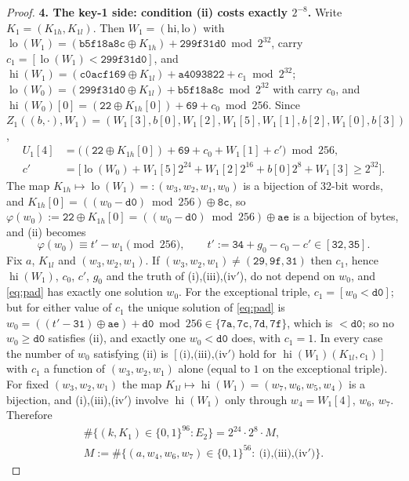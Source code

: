 \begin{proof}
\textbf{4. The key-1 side: condition (ii) costs exactly $2^{-8}$.}
Write $K_1=(K_{1h},K_{1l})$. Then $W_1=(\mathrm{hi},\mathrm{lo})$ with
$\operatorname{lo}(W_1)=(\mathtt{b5f18a8c}\oplus K_{1h})+\mathtt{299f31d0}\bmod2^{32}$, carry
$c_1=[\operatorname{lo}(W_1)<\mathtt{299f31d0}]$, and
$\operatorname{hi}(W_1)=(\mathtt{c0acf169}\oplus K_{1l})+\mathtt{a4093822}+c_1\bmod 2^{32}$;
$\operatorname{lo}(W_0)=(\mathtt{299f31d0}\oplus K_{1l})+\mathtt{b5f18a8c}\bmod2^{32}$ with carry $c_0$, and
$\operatorname{hi}(W_0)[0]=(\mathtt{22}\oplus K_{1h}[0])+\mathtt{69}+c_0\bmod256$.
Since $Z_1((b,\cdot),W_1)=(W_1[3],b[0],W_1[2],W_1[5],W_1[1],b[2],W_1[0],b[3])$,
\begin{align*}
U_1[4]&=\big((\mathtt{22}\oplus K_{1h}[0])+\mathtt{69}+c_0+W_1[1]+c'\big)\bmod256,\\
c'&=\big[\operatorname{lo}(W_0)+W_1[5]2^{24}+W_1[2]2^{16}+b[0]2^{8}+W_1[3]\ge2^{32}\big].
\end{align*}
The map $K_{1h}\mapsto\operatorname{lo}(W_1)=:(w_3,w_2,w_1,w_0)$ is a bijection of 32-bit words, and
$K_{1h}[0]=((w_0-\mathtt{d0})\bmod256)\oplus\mathtt{8c}$, so $\varphi(w_0):=\mathtt{22}\oplus K_{1h}[0]
=((w_0-\mathtt{d0})\bmod256)\oplus\mathtt{ae}$ is a bijection of bytes, and (ii) becomes
\begin{equation}\label{eq:pad}
\varphi(w_0)\equiv t'-w_1\pmod{256},\qquad t':=\mathtt{34}+g_0-c_0-c'\in[\mathtt{32},\mathtt{35}].
\end{equation}
Fix $a$, $K_{1l}$ and $(w_3,w_2,w_1)$. If $(w_3,w_2,w_1)\ne(\mathtt{29},\mathtt{9f},\mathtt{31})$ then
$c_1$, hence $\operatorname{hi}(W_1)$, $c_0$, $c'$, $g_0$ and the truth of (i),(iii),(iv$'$), do not depend on $w_0$,
and \eqref{eq:pad} has exactly one solution $w_0$. For the exceptional triple, $c_1=[w_0<\mathtt{d0}]$;
but for either value of $c_1$ the unique solution of \eqref{eq:pad} is
$w_0=((t'-\mathtt{31})\oplus\mathtt{ae})+\mathtt{d0}\bmod256\in\{\mathtt{7a},\mathtt{7c},\mathtt{7d},\mathtt{7f}\}$,
which is $<\mathtt{d0}$; so no $w_0\ge\mathtt{d0}$ satisfies (ii), and exactly one $w_0<\mathtt{d0}$ does,
with $c_1=1$. In every case the number of $w_0$ satisfying (ii) is $[\text{(i),(iii),(iv$'$) hold for }
\operatorname{hi}(W_1)(K_{1l},c_1)]$ with $c_1$ a function of $(w_3,w_2,w_1)$ alone (equal to $1$ on the
exceptional triple). For fixed $(w_3,w_2,w_1)$ the map $K_{1l}\mapsto\operatorname{hi}(W_1)=(w_7,w_6,w_5,w_4)$ is a
bijection, and (i),(iii),(iv$'$) involve $\operatorname{hi}(W_1)$ only through $w_4=W_1[4]$, $w_6$, $w_7$. Therefore
\begin{equation}\label{eq:N}
\begin{gathered}
\#\{(k,K_1)\in\{0,1\}^{96}: E_2\}=2^{24}\cdot 2^{8}\cdot M,\\
M:=\#\{(a,w_4,w_6,w_7)\in\{0,1\}^{56}:\ \text{(i),(iii),(iv$'$)}\}.
\end{gathered}
\end{equation}


\end{proof}
